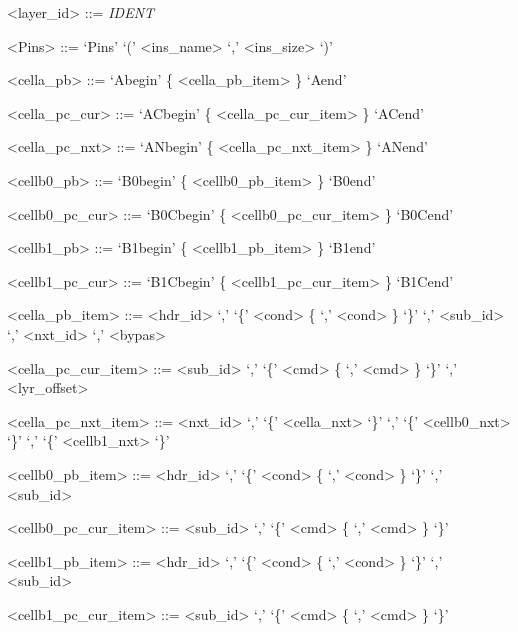 \documentclass{article}
\begin{document}
\begin{grammar} \small

{\renewcommand\baselinestretch{0}\selectfont

<layer\_id>     ::=   \emph{IDENT}

<Pins>   ::=   `Pins' `(' <ins\_name> `,' <ins\_size> `)'

<cella\_pb>     ::=   `Abegin' \{ <cella\_pb\_item> \} `Aend'

<cella\_pc\_cur>     ::=   `ACbegin' \{ <cella\_pc\_cur\_item> \}  `ACend'

<cella\_pc\_nxt>     ::=   `ANbegin' \{ <cella\_pc\_nxt\_item> \}  `ANend'

<cellb0\_pb>     ::=   `B0begin' \{ <cellb0\_pb\_item> \}  `B0end'

<cellb0\_pc\_cur>     ::=   `B0Cbegin' \{ <cellb0\_pc\_cur\_item> \}  `B0Cend'

<cellb1\_pb>     ::=   `B1begin' \{ <cellb1\_pb\_item> \}  `B1end'

<cellb1\_pc\_cur>     ::=   `B1Cbegin' \{ <cellb1\_pc\_cur\_item> \}  `B1Cend'

\par}

\end{grammar}


\begin{grammar} \small

{\renewcommand\baselinestretch{0}\selectfont

<cella\_pb\_item>     ::=   <hdr\_id> `,' `\{' <cond>  \{ `,' <cond> \} `\}' `,' <sub\_id> `,' <nxt\_id> `,' <bypas>

<cella\_pc\_cur\_item>     ::=   <sub\_id> `,' `\{' <cmd>  \{ `,' <cmd> \} `\}' `,' <lyr\_offset>

<cella\_pc\_nxt\_item>     ::=   <nxt\_id> `,' `\{' <cella\_nxt> `\}' `,' `\{' <cellb0\_nxt> `\}' `,' `\{' <cellb1\_nxt> `\}'

<cellb0\_pb\_item>     ::=   <hdr\_id> `,' `\{' <cond> \{ `,' <cond> \} `\}' `,' <sub\_id>

<cellb0\_pc\_cur\_item>     ::=   <sub\_id> `,' `\{' <cmd> \{ `,' <cmd> \} `\}'

<cellb1\_pb\_item>     ::=   <hdr\_id> `,' `\{' <cond>  \{ `,' <cond> \} `\}' `,' <sub\_id>

<cellb1\_pc\_cur\_item>     ::=   <sub\_id> `,' `\{' <cmd> \{ `,' <cmd> \} `\}'

\par}

\end{grammar}
\end{document}
